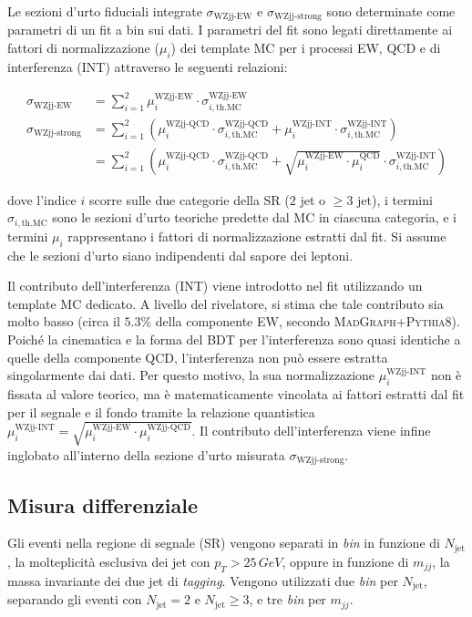 \documentclass[11pt]{article}
\newcommand{\mjj}{\ensuremath{m_{jj}}}
\begin{document}
Le sezioni d'urto fiduciali integrate $\sigma_{\text{WZjj-EW}}$ e $\sigma_{\text{WZjj-strong}}$ sono determinate come parametri di un fit a bin sui dati. I parametri del fit sono legati direttamente ai fattori di normalizzazione ($\mu_i$) dei template MC per i processi EW, QCD e di interferenza (INT) attraverso le seguenti relazioni:

\begin{equation}
\begin{aligned}
\sigma_{\text{WZjj-EW}} &= \sum_{i=1}^{2} \mu_i^{\text{WZjj-EW}} \cdot \sigma_{i,\text{th.MC}}^{\text{WZjj-EW}} \\
\sigma_{\text{WZjj-strong}} &= \sum_{i=1}^{2} \left( \mu_i^{\text{WZjj-QCD}} \cdot \sigma_{i,\text{th.MC}}^{\text{WZjj-QCD}} + \mu_i^{\text{WZjj-INT}} \cdot \sigma_{i,\text{th.MC}}^{\text{WZjj-INT}} \right) \\
&= \sum_{i=1}^{2} \left( \mu_i^{\text{WZjj-QCD}} \cdot \sigma_{i,\text{th.MC}}^{\text{WZjj-QCD}} + \sqrt{\mu_i^{\text{WZjj-EW}} \cdot \mu_i^{\text{QCD}}} \cdot \sigma_{i,\text{th.MC}}^{\text{WZjj-INT}} \right)
\end{aligned}
\end{equation}

dove l'indice $i$ scorre sulle due categorie della SR ($2$ jet o $\ge 3$ jet), i termini $\sigma_{i,\text{th.MC}}$ sono le sezioni d'urto teoriche predette dal MC in ciascuna categoria, e i termini $\mu_i$ rappresentano i fattori di normalizzazione estratti dal fit. Si assume che le sezioni d'urto siano indipendenti dal sapore dei leptoni.

Il contributo dell'interferenza (INT) viene introdotto nel fit utilizzando un template MC dedicato. A livello del rivelatore, si stima che tale contributo sia molto basso (circa il $5.3\%$ della componente EW, secondo \textsc{MadGraph}+\textsc{Pythia8}). Poiché la cinematica e la forma del BDT per l'interferenza sono quasi identiche a quelle della componente QCD, l'interferenza non può essere estratta singolarmente dai dati. Per questo motivo, la sua normalizzazione $\mu_i^{\text{WZjj-INT}}$ non è fissata al valore teorico, ma è matematicamente vincolata ai fattori estratti dal fit per il segnale e il fondo tramite la relazione quantistica $\mu_i^{\text{WZjj-INT}} = \sqrt{\mu_i^{\text{WZjj-EW}} \cdot \mu_i^{\text{WZjj-QCD}}}$. Il contributo dell'interferenza viene infine inglobato all'interno della sezione d'urto misurata $\sigma_{\text{WZjj-strong}}$.

\subsection{Misura differenziale}
Gli eventi nella regione di segnale (SR) vengono separati in \textit{bin} in funzione di $N_{\text{jet}}$, la molteplicità esclusiva dei jet con $p_T > 25\,\unit{GeV}$, oppure in funzione di $\mjj$, la massa invariante dei due jet di \textit{tagging}. Vengono utilizzati due \textit{bin} per $N_{\text{jet}}$, separando gli eventi con $N_{\text{jet}} = 2$ e $N_{\text{jet}} \ge 3$, e tre \textit{bin} per $\mjj$. 
\end{document}
